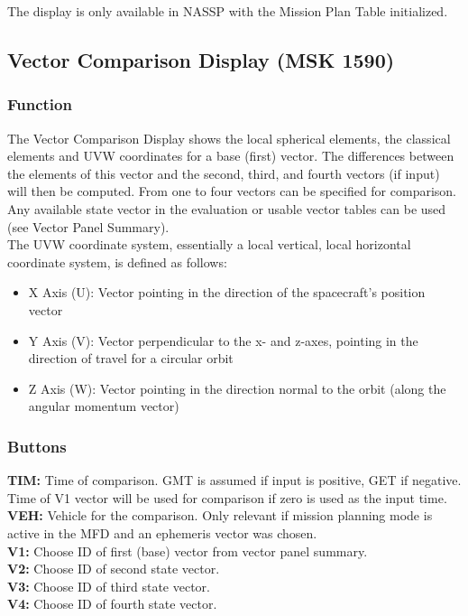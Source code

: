 \documentclass[11pt]{article} %
\begin{document}
The display is only available in NASSP with the Mission Plan Table initialized.\\
\newpage
\subsection{Vector Comparison Display (MSK 1590)}

\subsubsection{Function}

The Vector Comparison Display shows the local spherical elements, the classical elements and UVW coordinates for a base (first) vector. The differences between the elements of this vector and the second, third, and fourth vectors (if input) will then be computed. From one to four vectors can be specified for comparison. Any available state vector in the evaluation or usable vector tables can be used (see Vector Panel Summary).\\

The UVW coordinate system, essentially a local vertical, local horizontal coordinate system, is defined as follows:

\begin{itemize}
	\item X Axis (U): Vector pointing in the direction of the spacecraft's position vector\\
	\item Y Axis (V): Vector perpendicular to the x- and z-axes, pointing in the direction of travel for a circular orbit\\
	\item Z Axis (W): Vector pointing in the direction normal to the orbit (along the angular momentum vector)\\
\end{itemize}

\subsubsection{Buttons}

\textbf{TIM:} Time of comparison. GMT is assumed if input is positive, GET if negative. Time of V1 vector will be used for comparison if zero is used as the input time.\\
\textbf{VEH:} Vehicle for the comparison. Only relevant if mission planning mode is active in the MFD and an ephemeris vector was chosen.\\
\textbf{V1:} Choose ID of first (base) vector from vector panel summary.\\
\textbf{V2:} Choose ID of second state vector.\\
\textbf{V3:} Choose ID of third state vector.\\
\textbf{V4:} Choose ID of fourth state vector.\\
\end{document}

